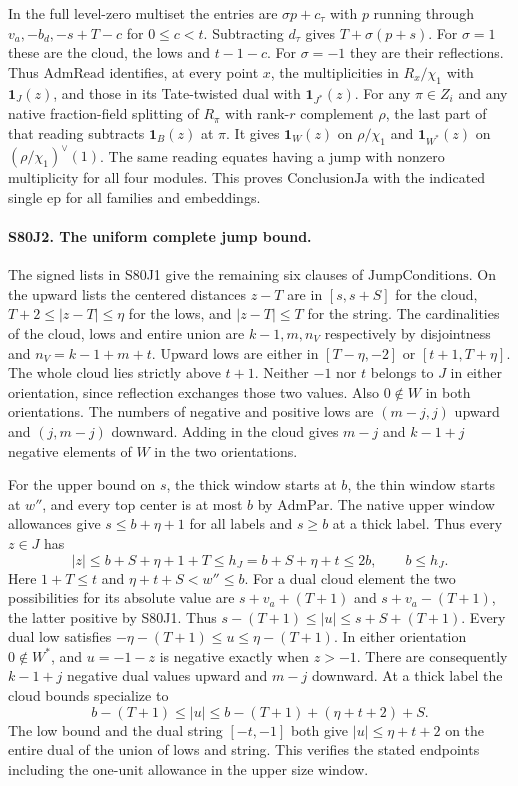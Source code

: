 In the full level-zero multiset the entries are $\sigma p+c_\tau$
with $p$ running through $v_a,-b_d,-s+T-c$ for $0\le c<t$.
Subtracting $d_\tau$ gives $T+\sigma(p+s)$. For $\sigma=1$
these are the cloud, the lows and $t-1-c$. For $\sigma=-1$
they are their reflections. Thus $\mathrm{AdmRead}$ identifies, at
every point $x$, the multiplicities in $R_x/\chi_1$ with
$\mathbf1_J(z)$, and those in its Tate-twisted dual with
$\mathbf1_{J^*}(z)$. For any $\pi\in Z_i$ and any native
fraction-field splitting of $R_\pi$ with rank-$r$ complement $\rho$,
the last part of that reading subtracts $\mathbf1_B(z)$ at $\pi$.
It gives $\mathbf1_W(z)$ on $\rho/\chi_1$ and
$\mathbf1_{W^*}(z)$ on $(\rho/\chi_1)^\vee(1)$. The same reading
equates having a jump with nonzero multiplicity for all four
modules. This proves $\mathrm{ConclusionJa}$ with the indicated
single $\mathrm{ep}$ for all families and embeddings.

\paragraph{S80J2. The uniform complete jump bound.}
The signed lists in S80J1 give the remaining six clauses of
$\mathrm{JumpConditions}$. On the upward lists the centered
distances $z-T$ are in $[s,s+S]$ for the cloud,
$T+2\le |z-T|\le\eta$ for the lows, and $|z-T|\le T$ for the
string. The cardinalities of the cloud, lows and entire union are
$k-1,m,n_V$ respectively by disjointness and $n_V=k-1+m+t$.
Upward lows are either in $[T-\eta,-2]$ or $[t+1,T+\eta]$.
The whole cloud lies strictly above $t+1$.
Neither $-1$ nor $t$ belongs to $J$ in either orientation, since
reflection exchanges those two values. Also $0\notin W$ in both
orientations. The numbers of negative and positive lows are
$(m-j,j)$ upward and $(j,m-j)$ downward. Adding in the cloud
gives $m-j$ and $k-1+j$ negative elements of $W$ in the two
orientations.

For the upper bound on $s$, the thick window starts at $b$, the
thin window starts at $w''$, and every top center is at most $b$
by $\mathrm{AdmPar}$. The native upper window allowances give
$s\le b+\eta+1$ for all labels and $s\ge b$ at a thick label.
Thus every $z\in J$ has
\[
 |z|\le b+S+\eta+1+T\le h_J=b+S+\eta+t\le2b,\qquad b\le h_J.
\]
Here $1+T\le t$ and $\eta+t+S<w''\le b$. For a dual cloud element
the two possibilities for its absolute value are $s+v_a+(T+1)$
and $s+v_a-(T+1)$, the latter positive by S80J1.
Thus $s-(T+1)\le |u|\le s+S+(T+1)$. Every dual low satisfies
$-\eta-(T+1)\le u\le\eta-(T+1)$. In either orientation
$0\notin W^*$, and $u=-1-z$ is negative exactly when $z>-1$.
There are consequently $k-1+j$ negative dual values upward and
$m-j$ downward. At a thick label the cloud bounds specialize to
\[
 b-(T+1)\le |u|\le b-(T+1)+(\eta+t+2)+S .
\]
The low bound and the dual string $[-t,-1]$ both give
$|u|\le\eta+t+2$ on the entire dual of the union of lows and string.
This verifies the stated endpoints including the one-unit allowance
in the upper size window.

